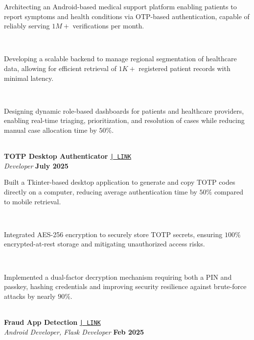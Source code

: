 \documentclass[a4paper,10pt]{article}
\begin{document}
\noindent\makebox[1.5em][l]{--}%
\parbox[t]{\dimexpr\linewidth-1.5em\relax}{%
Architecting an Android-based medical support platform enabling patients to report symptoms and health conditions via OTP-based authentication, capable of reliably serving $1M+$ verifications per month.} \\[0pt]

\noindent\makebox[1.5em][l]{--}%
\parbox[t]{\dimexpr\linewidth-1.5em\relax}{%
Developing a scalable backend to manage regional segmentation of healthcare data, allowing for efficient retrieval of $1K+$ registered patient records with minimal latency.} \\[0pt]

\noindent\makebox[1.5em][l]{--}%
\parbox[t]{\dimexpr\linewidth-1.5em\relax}{%
Designing dynamic role-based dashboards for patients and healthcare providers, enabling real-time triaging, prioritization, and resolution of cases while reducing manual case allocation time by $50\%$.} \\[4pt]



\noindent
\textbf{TOTP Desktop Authenticator}
\href{https://github.com/ppriyanshu26/AuthPublic}{\texttt{| LINK}} \\
\textit{Developer} \hfill \textbf{July 2025} \\[-8pt]

\noindent\makebox[1.5em][l]{--}%
\parbox[t]{\dimexpr\linewidth-1.5em\relax}{%
Built a Tkinter-based desktop application to generate and copy TOTP codes directly on a computer, reducing average authentication time by $50\%$ compared to mobile retrieval.} \\[0pt]

\noindent\makebox[1.5em][l]{--}%
\parbox[t]{\dimexpr\linewidth-1.5em\relax}{%
Integrated AES-256 encryption to securely store TOTP secrets, ensuring $100\%$ encrypted-at-rest storage and mitigating unauthorized access risks.} \\[0pt]

\noindent\makebox[1.5em][l]{--}%
\parbox[t]{\dimexpr\linewidth-1.5em\relax}{%
Implemented a dual-factor decryption mechanism requiring both a PIN and passkey, hashing credentials and improving security resilience against brute-force attacks by nearly $90\%$.} \\[4pt]


\noindent
\textbf{Fraud App Detection}
\href{https://github.com/ppriyanshu26/FraudApp}{\texttt{| LINK}} \\
\textit{Android Developer, Flask Developer} \hfill \textbf{Feb 2025} \\[-8pt]
\end{document}
